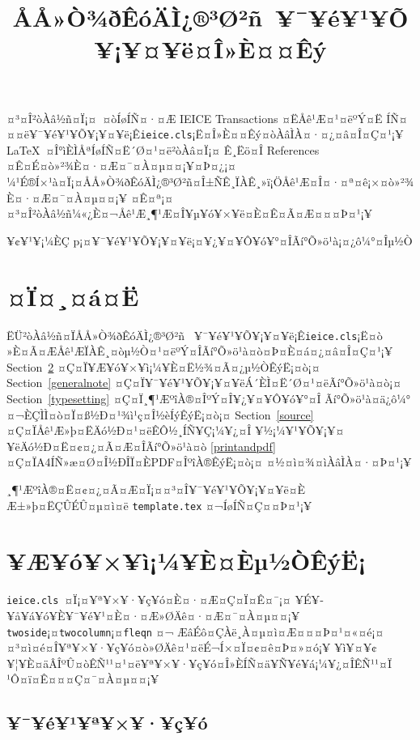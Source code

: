 \documentclass[paper]{ieice}
\title{ÅÅ»Ò¾ðÊóÄÌ¿®³Ø²ñ\LaTeXe\ ¥¯¥é¥¹¥Õ¥¡¥¤¥ë¤Î»È¤¤Êý}
\def\ClassFile{\texttt{ieice.cls}}
\begin{document}
\maketitle

\begin{summary}
¤³¤Î²òÀâ½ñ¤Ï¡¤\LaTeXe\ ¤òÍøÍÑ¤·¤Æ IEICE Transactions ¤ËÅê¹Æ¤¹¤ëºÝ¤Ë
ÍÑ¤¤¤ë¥¯¥é¥¹¥Õ¥¡¥¤¥ë¡Ê\ClassFile{}¡Ë¤Î»È¤¤Êý¤òÀâÌÀ¤·¤¿¤â¤Î¤Ç¤¹¡¥
\LaTeX\ ¤Î°ìÈÌÅªÍøÍÑ¤Ë´Ø¤¹¤ë²òÀâ¤Ï¡¤
Ê¸Ëö¤Î References ¤Ê¤É¤ò»²¾È¤·¤Æ¤¯¤À¤µ¤¤¡¥¤Þ¤¿¡¤
¼¹É®Í×¹à¤Ï¡¤ÅÅ»Ò¾ðÊóÄÌ¿®³Ø²ñ¤Î±ÑÊ¸ÏÀÊ¸»ï¡ÖÅê¹Æ¤Î¤·¤ª¤ê¡×¤ò»²¾È¤·¤Æ¤¯¤À¤µ¤¤¡¥
¤Ê¤ª¡¤¤³¤Î²òÀâ½ñ¼«¿È¤¬Åê¹Æ¸¶¹Æ¤Î¥µ¥ó¥×¥ë¤È¤Ê¤Ã¤Æ¤¤¤Þ¤¹¡¥
\end{summary}
\begin{keywords}
¥¢¥¹¥­¡¼ÈÇ p\LaTeXe{}¡¤¥¯¥é¥¹¥Õ¥¡¥¤¥ë¡¤¥¿¥¤¥Ô¥ó¥°¤ÎÃí°Õ»ö¹à¡¤¿ô¼°¤Îµ­½Ò
\end{keywords}

\section{¤Ï¤¸¤á¤Ë}\label{intro}

ËÜ²òÀâ½ñ¤ÏÅÅ»Ò¾ðÊóÄÌ¿®³Ø²ñ \LaTeXe\ ¥¯¥é¥¹¥Õ¥¡¥¤¥ë¡Ê\ClassFile{}¡Ë¤ò
»È¤Ã¤ÆÅê¹ÆÏÀÊ¸¤òµ­½Ò¤¹¤ëºÝ¤ÎÃí°Õ»ö¹à¤ò¤Þ¤È¤á¤¿¤â¤Î¤Ç¤¹¡¥
Section~\ref{usage} ¤Ç¤Ï¥Æ¥ó¥×¥ì¡¼¥È¤Ë½¾¤Ã¤¿µ­½ÒÊýË¡¤ò¡¤
Section~\ref{generalnote} ¤Ç¤Ï¥¯¥é¥¹¥Õ¥¡¥¤¥ëÁ´ÈÌ¤Ë´Ø¤¹¤ëÃí°Õ»ö¹à¤ò¡¤
Section~\ref{typesetting} ¤Ç¤Ï¸¶¹ÆºîÀ®¤ÎºÝ¤Î¥¿¥¤¥Ô¥ó¥°¤Î
Ãí°Õ»ö¹à¤ä¿ô¼°¤¬ÈÇÌÌ¤ò¤Ï¤ß½Ð¤¹¾ì¹ç¤Î½èÍýÊýË¡¤ò¡¤
Section~\ref{source} ¤Ç¤ÏÅê¹Æ»þ¤ËÄó½Ð¤¹¤ëÊÔ½¸ÍÑ¥Ç¡¼¥¿¤Î
¥½¡¼¥¹¥Õ¥¡¥¤¥ëÄó½Ð¤Ë¤¢¤¿¤Ã¤Æ¤ÎÃí°Õ»ö¹à¤ò
\ref{printandpdf} ¤Ç¤ÏA4ÍÑ»æ¤Ø¤Î½ÐÎÏ¤ÈPDF¤ÎºîÀ®ÊýË¡¤ò¡¤
¤½¤ì¤¾¤ìÀâÌÀ¤·¤Þ¤¹¡¥

¸¶¹ÆºîÀ®¤Ë¤¢¤¿¤Ã¤Æ¤Ï¡¤¤³¤Î¥¯¥é¥¹¥Õ¥¡¥¤¥ë¤È
Æ±»þ¤ËÇÛÉÛ¤µ¤ì¤ë \texttt{template.tex} ¤¬ÍøÍÑ¤Ç¤­¤Þ¤¹¡¥

\section{¥Æ¥ó¥×¥ì¡¼¥È¤Èµ­½ÒÊýË¡}\label{usage}

\ClassFile\ ¤Ï¡¤¥ª¥×¥·¥ç¥ó¤È¤·¤Æ¤Ç¤Ï¤Ê¤¯¡¤
¥É¥­¥å¥á¥ó¥È¥¯¥é¥¹¤È¤·¤Æ»ØÄê¤·¤Æ¤¯¤À¤µ¤¤¡¥
\texttt{twoside}¡¤\texttt{twocolumn}¡¤\texttt{fleqn} ¤¬
ÆâÉô¤ÇÀë¸À¤µ¤ì¤Æ¤¤¤Þ¤¹¤«¤é¡¤¤³¤ì¤é¤Î¥ª¥×¥·¥ç¥ó¤ò»ØÄê¤¹¤ëÉ¬Í×¤Ï¤¢¤ê¤Þ¤»¤ó¡¥
¥ì¥¤¥¢¥¦¥È¤äÂÎºÛ¤òÊÑ¹¹¤¹¤ë¥ª¥×¥·¥ç¥ó¤Î»ÈÍÑ¤ä¥Ñ¥é¥á¡¼¥¿¤ÎÊÑ¹¹¤Ï
¹Ô¤ï¤Ê¤¤¤Ç¤¯¤À¤µ¤¤¡¥

\subsection{¥¯¥é¥¹¥ª¥×¥·¥ç¥ó}
\end{document}
